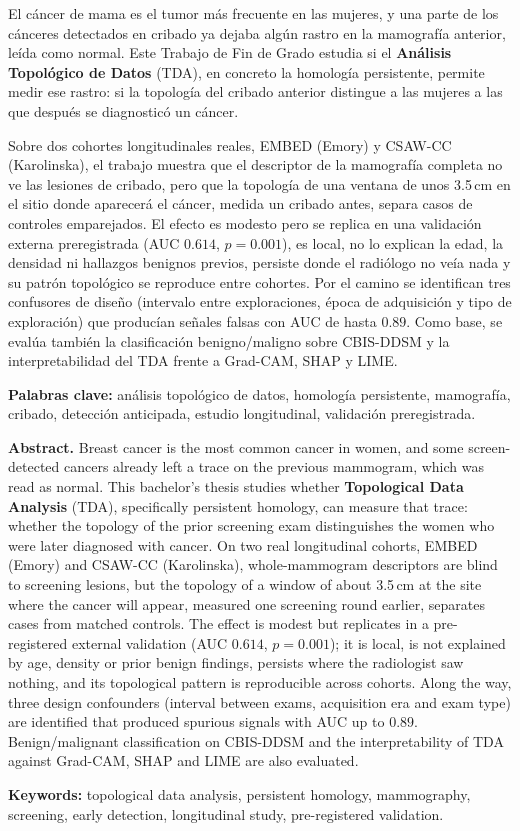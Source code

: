 
\noindent
El cáncer de mama es el tumor más frecuente en las mujeres, y una parte de
los cánceres detectados en cribado ya dejaba algún rastro en la mamografía
anterior, leída como normal. Este Trabajo de Fin de Grado estudia si el
\textbf{Análisis Topológico de Datos} (TDA), en concreto la homología
persistente, permite medir ese rastro: si la topología del cribado anterior
distingue a las mujeres a las que después se diagnosticó un cáncer.

\medskip
\noindent
Sobre dos cohortes longitudinales reales, EMBED (Emory) y CSAW-CC
(Karolinska), el trabajo muestra que el descriptor de la mamografía completa
no ve las lesiones de cribado, pero que la topología de una ventana de unos
3.5\,cm en el sitio donde aparecerá el cáncer, medida un cribado antes,
separa casos de controles emparejados. El efecto es modesto pero se replica
en una validación externa preregistrada (AUC $0.614$, $p = 0.001$), es local,
no lo explican la edad, la densidad ni hallazgos benignos previos, persiste
donde el radiólogo no veía nada y su patrón topológico se reproduce entre
cohortes. Por el camino se identifican tres confusores de diseño (intervalo
entre exploraciones, época de adquisición y tipo de exploración) que
producían señales falsas con AUC de hasta $0.89$. Como base, se evalúa
también la clasificación benigno/maligno sobre CBIS-DDSM y la
interpretabilidad del TDA frente a Grad-CAM, SHAP y LIME.

\vspace{1cm}
\noindent\textbf{Palabras clave:} análisis topológico de datos, homología
persistente, mamografía, cribado, detección anticipada, estudio
longitudinal, validación preregistrada.

\newpage
{}
\noindent\textbf{Abstract.}
Breast cancer is the most common cancer in women, and some screen-detected
cancers already left a trace on the previous mammogram, which was read as
normal. This bachelor's thesis studies whether \textbf{Topological Data
Analysis} (TDA), specifically persistent homology, can measure that trace:
whether the topology of the prior screening exam distinguishes the women who
were later diagnosed with cancer. On two real longitudinal cohorts, EMBED
(Emory) and CSAW-CC (Karolinska), whole-mammogram descriptors are blind to
screening lesions, but the topology of a window of about 3.5\,cm at the site
where the cancer will appear, measured one screening round earlier,
separates cases from matched controls. The effect is modest but replicates
in a pre-registered external validation (AUC $0.614$, $p = 0.001$); it is
local, is not explained by age, density or prior benign findings, persists
where the radiologist saw nothing, and its topological pattern is
reproducible across cohorts. Along the way, three design confounders
(interval between exams, acquisition era and exam type) are identified that
produced spurious signals with AUC up to $0.89$. Benign/malignant
classification on CBIS-DDSM and the interpretability of TDA against
Grad-CAM, SHAP and LIME are also evaluated.

\medskip
\noindent\textbf{Keywords:} topological data analysis, persistent homology,
mammography, screening, early detection, longitudinal study, pre-registered
validation.
